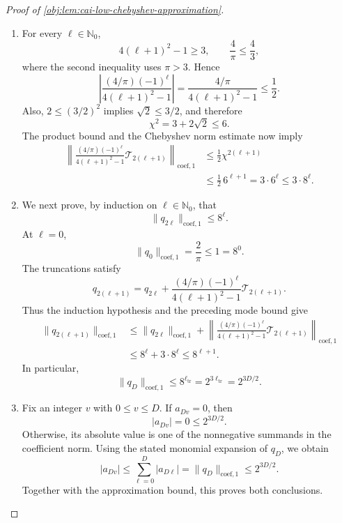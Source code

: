 \documentclass[11pt]{article}
\begin{document}
\begin{proof}[Proof of \cref{obj:lem:cai-low-chebyshev-approximation}]
\begin{enumerate}
\item For every \(\ell\in\mathbb N_0\),
\[
4(\ell+1)^2-1\ge3,\qquad
\frac4\pi\le\frac43,
\]
where the second inequality uses \(\pi>3\). Hence
\[
\left|
 \frac{(4/\pi)(-1)^\ell}{4(\ell+1)^2-1}
\right|
=\frac{4/\pi}{4(\ell+1)^2-1}
\le\frac12.
\]
Also, \(2\le(3/2)^2\) implies \(\sqrt2\le3/2\), and therefore
\[
\chi^2=3+2\sqrt2\le6.
\]
The product bound and the Chebyshev norm estimate now imply
\[
\begin{aligned}
\left\|
 \frac{(4/\pi)(-1)^\ell}{4(\ell+1)^2-1}
 \mathcal T_{2(\ell+1)}
\right\|_{\mathrm{coef},1}
&\le\frac12\chi^{2(\ell+1)}\\
&\le\frac12\,6^{\ell+1}
=3\cdot6^\ell
\le3\cdot8^\ell.
\end{aligned}
\]

\item We next prove, by induction on \(\ell\in\mathbb N_0\), that
\[
\|q_{2\ell}\|_{\mathrm{coef},1}\le8^\ell.
\]
At \(\ell=0\),
\[
\|q_0\|_{\mathrm{coef},1}=\frac2\pi\le1=8^0.
\]
The truncations satisfy
\[
q_{2(\ell+1)}
=q_{2\ell}
+\frac{(4/\pi)(-1)^\ell}{4(\ell+1)^2-1}
 \mathcal T_{2(\ell+1)}.
\]
Thus the induction hypothesis and the preceding mode bound give
\[
\begin{aligned}
\|q_{2(\ell+1)}\|_{\mathrm{coef},1}
&\le\|q_{2\ell}\|_{\mathrm{coef},1}
+\left\|
 \frac{(4/\pi)(-1)^\ell}{4(\ell+1)^2-1}
 \mathcal T_{2(\ell+1)}
 \right\|_{\mathrm{coef},1}\\
&\le8^\ell+3\cdot8^\ell
\le8^{\ell+1}.
\end{aligned}
\]
In particular,
\[
\|q_D\|_{\mathrm{coef},1}
\le8^{\ell_{\mathrm{tr}}}
=2^{3\ell_{\mathrm{tr}}}
=2^{3D/2}.
\]

\item Fix an integer \(v\) with \(0\le v\le D\). If \(a_{Dv}=0\), then
\[
|a_{Dv}|=0\le2^{3D/2}.
\]
Otherwise, its absolute value is one of the nonnegative summands in the coefficient norm. Using the stated monomial expansion of \(q_D\), we obtain
\[
|a_{Dv}|
\le\sum_{\ell=0}^{D}|a_{D\ell}|
=\|q_D\|_{\mathrm{coef},1}
\le2^{3D/2}.
\]
Together with the approximation bound, this proves both conclusions.
\end{enumerate}
\end{proof}
\end{document}
